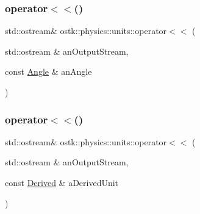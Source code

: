 \subsubsection{\texorpdfstring{operator$<$$<$()}{operator<<()}\hspace{0.1cm}{\footnotesize\ttfamily [2/3]}}
{\footnotesize\ttfamily std\+::ostream\& ostk\+::physics\+::units\+::operator$<$$<$ (\begin{DoxyParamCaption}\item[{std\+::ostream \&}]{an\+Output\+Stream,  }\item[{const \hyperlink{classostk_1_1physics_1_1units_1_1_angle}{Angle} \&}]{an\+Angle }\end{DoxyParamCaption})}

\mbox{\label{namespaceostk_1_1physics_1_1units_afd67c078221ddcb91dc4765629f483d8}} 
\subsubsection{\texorpdfstring{operator$<$$<$()}{operator<<()}\hspace{0.1cm}{\footnotesize\ttfamily [3/3]}}
{\footnotesize\ttfamily std\+::ostream\& ostk\+::physics\+::units\+::operator$<$$<$ (\begin{DoxyParamCaption}\item[{std\+::ostream \&}]{an\+Output\+Stream,  }\item[{const \hyperlink{classostk_1_1physics_1_1units_1_1_derived}{Derived} \&}]{a\+Derived\+Unit }\end{DoxyParamCaption})}

